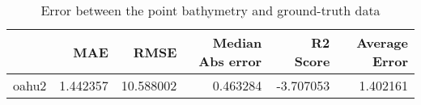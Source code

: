 \begin{table}[h!]
\caption{Error between the point bathymetry and ground-truth data}
\label{tab:oahu2_lidar_error}
\begin{tabular}{lrrrrr}
\toprule
 & MAE & RMSE & Median Abs error & R2 Score & Average Error \\
\midrule
oahu2 & 1.442357 & 10.588002 & 0.463284 & -3.707053 & 1.402161 \\
\bottomrule
\end{tabular}
\end{table}

